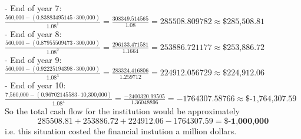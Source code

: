 \documentclass{article}
\begin{document}
{- End of year 7: \(\frac{\text{560,000} - (0.83883495145 \cdot \text{300,000})}{1.08^1} = \frac{308349.514565}{1.08} = 285508.809782 \approx \text{\$285,508.81}\) \\ 
- End of year 8: \(\frac{\text{560,000} - (0.87955509473 \cdot \text{300,000})}{1.08^2} = \frac{296133.471581}{1.1664} = 253886.721177 \approx \text{\$253,886.72} \) \\
- End of year 9: \(\frac{\text{560,000} - (0.92225194398 \cdot \text{300,000})}{1.08^3} = \frac{283324.416806}{1.259712} = 224912.056729 \approx \text{\$224,912.06} \) \\
- End of year 10: \(\frac{\text{7,560,000} - (0.96702145583 \cdot \text{10,300,000})}{1.08^4} = \frac{-2400320.99505}{1.36048896} = -1764307.58766 \approx \text{\$-1,764,307.59} \) \\
So the total cash flow for the institution would be approximately
\[
  285508.81 + 253886.72 + 224912.06 - 1764307.59 = \boxed{\textbf{\$-1,000,000}}
\]
i.e. this situation costed the financial instution a million dollars.

}
\end{document}
